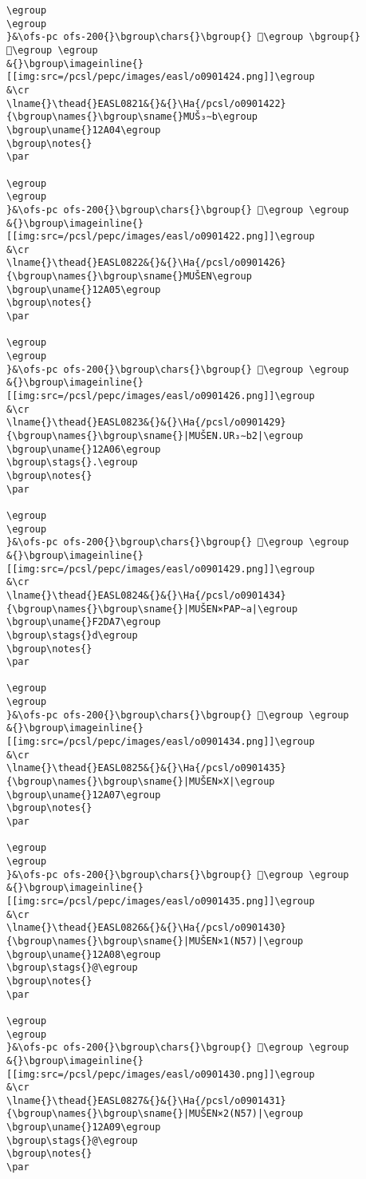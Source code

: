 \begin{verbatim}
\egroup
\egroup
}&\ofs-pc ofs-200{}\bgroup\chars{}\bgroup{} 𒨀\egroup \bgroup{} 𒨁\egroup \egroup
&{}\bgroup\imageinline{}[[img:src=/pcsl/pepc/images/easl/o0901424.png]]\egroup
&\cr
\lname{}\thead{}EASL0821&{}&{}\Ha{/pcsl/o0901422}{\bgroup\names{}\bgroup\sname{}MUŠ₃∼b\egroup
\bgroup\uname{}12A04\egroup
\bgroup\notes{}
\par 

\egroup
\egroup
}&\ofs-pc ofs-200{}\bgroup\chars{}\bgroup{} 𒨄\egroup \egroup
&{}\bgroup\imageinline{}[[img:src=/pcsl/pepc/images/easl/o0901422.png]]\egroup
&\cr
\lname{}\thead{}EASL0822&{}&{}\Ha{/pcsl/o0901426}{\bgroup\names{}\bgroup\sname{}MUŠEN\egroup
\bgroup\uname{}12A05\egroup
\bgroup\notes{}
\par 

\egroup
\egroup
}&\ofs-pc ofs-200{}\bgroup\chars{}\bgroup{} 𒨅\egroup \egroup
&{}\bgroup\imageinline{}[[img:src=/pcsl/pepc/images/easl/o0901426.png]]\egroup
&\cr
\lname{}\thead{}EASL0823&{}&{}\Ha{/pcsl/o0901429}{\bgroup\names{}\bgroup\sname{}|MUŠEN.UR₃∼b2|\egroup
\bgroup\uname{}12A06\egroup
\bgroup\stags{}.\egroup
\bgroup\notes{}
\par 

\egroup
\egroup
}&\ofs-pc ofs-200{}\bgroup\chars{}\bgroup{} 𒨆\egroup \egroup
&{}\bgroup\imageinline{}[[img:src=/pcsl/pepc/images/easl/o0901429.png]]\egroup
&\cr
\lname{}\thead{}EASL0824&{}&{}\Ha{/pcsl/o0901434}{\bgroup\names{}\bgroup\sname{}|MUŠEN×PAP∼a|\egroup
\bgroup\uname{}F2DA7\egroup
\bgroup\stags{}d\egroup
\bgroup\notes{}
\par 

\egroup
\egroup
}&\ofs-pc ofs-200{}\bgroup\chars{}\bgroup{} 󲶧\egroup \egroup
&{}\bgroup\imageinline{}[[img:src=/pcsl/pepc/images/easl/o0901434.png]]\egroup
&\cr
\lname{}\thead{}EASL0825&{}&{}\Ha{/pcsl/o0901435}{\bgroup\names{}\bgroup\sname{}|MUŠEN×X|\egroup
\bgroup\uname{}12A07\egroup
\bgroup\notes{}
\par 

\egroup
\egroup
}&\ofs-pc ofs-200{}\bgroup\chars{}\bgroup{} 𒨇\egroup \egroup
&{}\bgroup\imageinline{}[[img:src=/pcsl/pepc/images/easl/o0901435.png]]\egroup
&\cr
\lname{}\thead{}EASL0826&{}&{}\Ha{/pcsl/o0901430}{\bgroup\names{}\bgroup\sname{}|MUŠEN×1(N57)|\egroup
\bgroup\uname{}12A08\egroup
\bgroup\stags{}@\egroup
\bgroup\notes{}
\par 

\egroup
\egroup
}&\ofs-pc ofs-200{}\bgroup\chars{}\bgroup{} 𒨈\egroup \egroup
&{}\bgroup\imageinline{}[[img:src=/pcsl/pepc/images/easl/o0901430.png]]\egroup
&\cr
\lname{}\thead{}EASL0827&{}&{}\Ha{/pcsl/o0901431}{\bgroup\names{}\bgroup\sname{}|MUŠEN×2(N57)|\egroup
\bgroup\uname{}12A09\egroup
\bgroup\stags{}@\egroup
\bgroup\notes{}
\par 


\end{verbatim}

